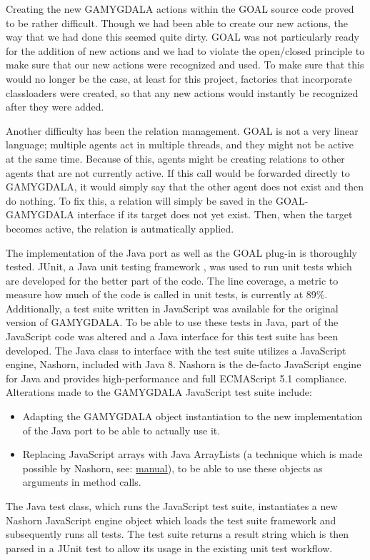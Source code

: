 Creating the new GAMYGDALA actions within the GOAL source code proved to be rather difficult. Though we had been able to create our new actions, the way that we had done this seemed quite dirty. GOAL was not particularly ready for the addition of new actions and we had to violate the open/closed principle to make sure that our new actions were recognized and used. To make sure that this would no longer be the case, at least for this project, factories that incorporate classloaders were created, so that any new actions would instantly be recognized after they were added.

Another difficulty has been the relation management. GOAL is not a very linear language; multiple agents act in multiple threads, and they might not be active at the same time. Because of this, agents might be creating relations to other agents that are not currently active. If this call would be forwarded directly to GAMYGDALA, it would simply say that the other agent does not exist and then do nothing. To fix this, a relation will simply be saved in the GOAL-GAMYGDALA interface if its target does not yet exist. Then, when the target becomes active, the relation is autmatically applied.

The implementation of the Java port as well as the GOAL plug-in is thoroughly tested. JUnit, a Java unit testing framework \citep{junit}, was used to run unit tests which are developed for the better part of the code. The line coverage, a metric to measure how much of the code is called in unit tests, is currently at 89\%. Additionally, a test suite written in JavaScript was available for the original version of GAMYGDALA. To be able to use these tests in Java, part of the JavaScript code was altered and a Java interface for this test suite has been developed. The Java class to interface with the test suite utilizes a JavaScript engine, Nashorn, included with Java 8. Nashorn is the de-facto JavaScript engine for Java and provides high-performance \citep{projnashorn} and full ECMAScript 5.1 compliance. Alterations made to the GAMYGDALA JavaScript test suite include:
\begin{itemize}
\item Adapting the GAMYGDALA object instantiation to the new implementation of the Java port to be able to actually use it.
\item Replacing JavaScript arrays with Java ArrayLists (a technique which is made possible by Nashorn, see: \href{http://docs.oracle.com/javase/8/docs/technotes/guides/scripting/prog_guide/javascript.html#A1147187}{manual}), to be able to use these objects as arguments in method calls.
\end{itemize}
The Java test class, which runs the JavaScript test suite, instantiates a new Nashorn JavaScript engine object which loads the test suite framework and subsequently runs all tests. The test suite returns a result string which is then parsed in a JUnit test to allow its usage in the existing unit test workflow.

